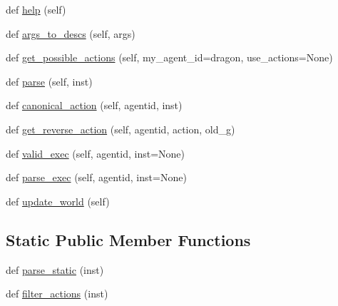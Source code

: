 \begin{DoxyCompactItemize}
\item 
def \hyperlink{classlight__chats_1_1graph_1_1Graph_a6a6d39a24244430a899bbc0b752baf25}{help} (self)
\item 
def \hyperlink{classlight__chats_1_1graph_1_1Graph_ad0c4f66ad462e7aa45324767c551030a}{args\+\_\+to\+\_\+descs} (self, args)
\item 
def \hyperlink{classlight__chats_1_1graph_1_1Graph_a40e6753f63c9c8d31dd57a5c38aaac3c}{get\+\_\+possible\+\_\+actions} (self, my\+\_\+agent\+\_\+id=\textquotesingle{}dragon\textquotesingle{}, use\+\_\+actions=None)
\item 
def \hyperlink{classlight__chats_1_1graph_1_1Graph_a5087252eb40253eacd115e777c092cd8}{parse} (self, inst)
\item 
def \hyperlink{classlight__chats_1_1graph_1_1Graph_af644853db532d4cfa276a884f04c8544}{canonical\+\_\+action} (self, agentid, inst)
\item 
def \hyperlink{classlight__chats_1_1graph_1_1Graph_a7b3fe43bf1e2b53fe7a2e22a24d77ef2}{get\+\_\+reverse\+\_\+action} (self, agentid, action, old\+\_\+g)
\item 
def \hyperlink{classlight__chats_1_1graph_1_1Graph_accd7dfd84e4f2bee3fc3fbac8d8577cd}{valid\+\_\+exec} (self, agentid, inst=None)
\item 
def \hyperlink{classlight__chats_1_1graph_1_1Graph_a9aede2dd27f6a9ab66f38eaa5f649195}{parse\+\_\+exec} (self, agentid, inst=None)
\item 
def \hyperlink{classlight__chats_1_1graph_1_1Graph_ab4e757d18538326e65b8ed2dce71d9fa}{update\+\_\+world} (self)
\end{DoxyCompactItemize}
\subsection*{Static Public Member Functions}
\begin{DoxyCompactItemize}
\item 
def \hyperlink{classlight__chats_1_1graph_1_1Graph_a6eaae6c0b9fbcaf9f478a790ff356671}{parse\+\_\+static} (inst)
\item 
def \hyperlink{classlight__chats_1_1graph_1_1Graph_a27cddf5bb9b3718a70a66ac91c22cf96}{filter\+\_\+actions} (inst)
\end{DoxyCompactItemize}
